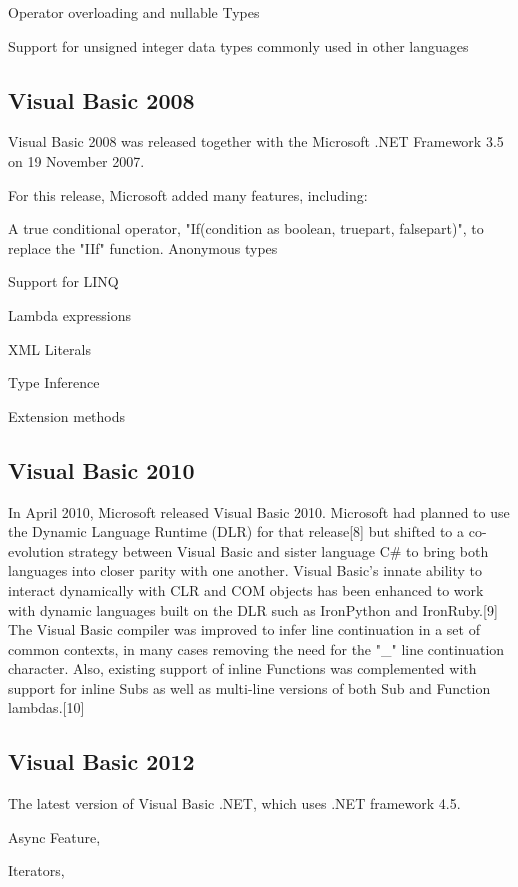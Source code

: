 Operator overloading and nullable Types

Support for unsigned integer data types commonly used in other languages



\subsection{Visual Basic 2008}
Visual Basic 2008 was released together with the Microsoft .NET Framework 3.5 on 19 November 2007.

For this release, Microsoft added many features, including:

A true conditional operator, "If(condition as boolean, truepart, falsepart)", to replace the "IIf" function.
Anonymous types

Support for LINQ

Lambda expressions

XML Literals

Type Inference

Extension methods

\subsection{Visual Basic 2010}

In April 2010, Microsoft released Visual Basic 2010. Microsoft had planned to use the Dynamic Language Runtime (DLR) for that release[8] but shifted to a co-evolution strategy between Visual Basic and sister language C\# to bring both languages into closer parity with one another. Visual Basic's innate ability to interact dynamically with CLR and COM objects has been enhanced to work with dynamic languages built on the DLR such as IronPython and IronRuby.[9] The Visual Basic compiler was improved to infer line continuation in a set of common contexts, in many cases removing the need for the "\_" line continuation character. Also, existing support of inline Functions was complemented with support for inline Subs as well as multi-line versions of both Sub and Function lambdas.[10]


\subsection{Visual Basic 2012}

The latest version of Visual Basic .NET, which uses .NET framework 4.5. 

Async Feature, 

Iterators, 

